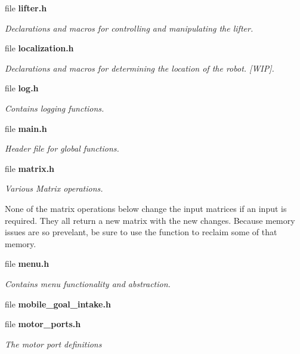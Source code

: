 \begin{DoxyCompactItemize}
file \textbf{ lifter.\+h}
\begin{DoxyCompactList}\small\item\em Declarations and macros for controlling and manipulating the lifter. \end{DoxyCompactList}\item 
file \textbf{ localization.\+h}
\begin{DoxyCompactList}\small\item\em Declarations and macros for determining the location of the robot. [W\+IP]. \end{DoxyCompactList}\item 
file \textbf{ log.\+h}
\begin{DoxyCompactList}\small\item\em Contains logging functions. \end{DoxyCompactList}\item 
file \textbf{ main.\+h}
\begin{DoxyCompactList}\small\item\em Header file for global functions. \end{DoxyCompactList}\item 
file \textbf{ matrix.\+h}
\begin{DoxyCompactList}\small\item\em Various Matrix operations.

None of the matrix operations below change the input matrices if an input is required. They all return a new matrix with the new changes. Because memory issues are so prevelant, be sure to use the  function to reclaim some of that memory. \end{DoxyCompactList}\item 
file \textbf{ menu.\+h}
\begin{DoxyCompactList}\small\item\em Contains menu functionality and abstraction. \end{DoxyCompactList}\item 
file \textbf{ mobile\+\_\+goal\+\_\+intake.\+h}
\item 
file \textbf{ motor\+\_\+ports.\+h}
\begin{DoxyCompactList}\small\item\em The motor port definitions


\end{DoxyCompactList}
\end{DoxyCompactItemize}

